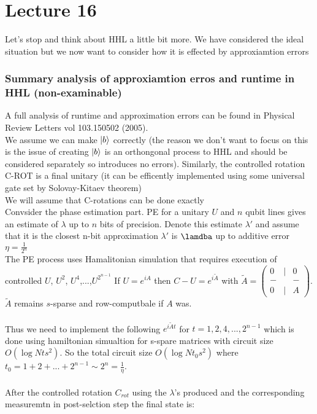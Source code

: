 \documentclass{article}
\begin{document}
 \section{Lecture 16}
 Let's stop and think about HHL a little bit more. We have considered the ideal situation but we now want to consider how it is effected by approxiamtion errors
 \subsubsection{Summary analysis of approxiamtion erros and runtime in HHL (non-examinable)}
 A full analysis of runtime and approximation errors can be found in Physical Review Letters vol 103.150502 (2005).\\
 We assume we can make $\ket{b}$ correctly (the reason we don't want to focus on this is the issue of creating $\ket{b}$ is an orthongonal process to HHL and should be considered separately so introduces no errors). Similarly, the controlled rotation C-ROT is a final unitary (it can be efficently implemented using some universal gate set by Solovay-Kitaev theorem)\\
 We will assume that C-rotations can be done exactly\\
 Convsider the phase estimation part. PE for a unitary $U$ and $n$ qubit lines gives an estimate of $\lambda$ up to $n$ bits of precision. Denote this estimate $\lambda'$ and assume that it is the closest n-bit approximation $\lambda'$ is $\lamdba$ up to additive error $\eta = \frac{1}{2^n}$\\
                       The PE process uses Hamalitonian simulation that requires execution of controlled $U$, $U^2$, $U^4$,...,$U^{2^{n-1}}$ If $U = e^{iA}$ then $C-U = e^{i \tilde A}$ with $\tilde A = \begin{pmatrix} 0 &|& 0 \\ -& & - \\ 0 & |& A \end{pmatrix}$. $\tilde A$ remains $s$-sparse and row-computbale if $A$ was. \\\\
                       Thus we need to implement the following $e^{i \tilde A t}$ for $t = 1,2,4,..., 2^{n-1}$ which is done using hamiltonian simualtion for s-spare matrices with circuit size $O(\log N t s^2)$. So the total circuit size $O(\log N t_0 s^2)$ where $t_0 = 1 + 2 + ... + 2^{n-1} \sim 2^n = \frac{1}{\eta}$. \\\\
                       After the controlled rotation $C_{rot}$ using the $\lambda$'s produced and the corresponding measuremtn in post-selction step the final state is:
\end{document}
